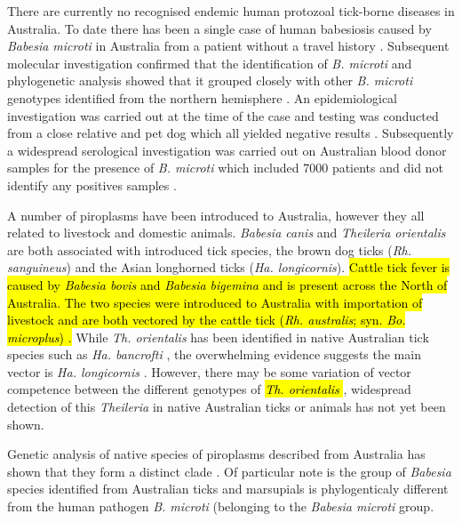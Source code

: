 \documentclass[a4paper, nobind]{templates/ociamthesis}
\begin{document}
There are currently no recognised endemic human protozoal tick-borne diseases in Australia.
To date there has been a single case of human babesiosis caused by \emph{Babesia microti} in Australia from a patient without a travel history \autocite{senanayakeFirstReportHuman2012}.
Subsequent molecular investigation confirmed that the identification of \emph{B. microti} and phylogenetic analysis showed that it grouped closely with other \emph{B. microti} genotypes identified from the northern hemisphere \autocite{papariniMolecularConfirmationFirst2014}.
An epidemiological investigation was carried out at the time of the case and testing was conducted from a close relative and pet dog which all yielded negative results \autocite{senanayakeFirstReportHuman2012}.
Subsequently a widespread serological investigation was carried out on Australian blood donor samples for the presence of \emph{B. microti} which included 7000 patients and did not identify any positives samples \autocite{faddyNoEvidenceWidespread2019}.

A number of piroplasms have been introduced to Australia, however they all related to livestock and domestic animals.
\emph{Babesia canis} and \emph{Theileria orientalis} are both associated with introduced tick species, the brown dog ticks (\emph{Rh. sanguineus}) and the Asian longhorned ticks (\emph{Ha. longicornis}).
\hl{Cattle tick fever is caused by \emph{Babesia bovis} and \emph{Babesia bigemina} and is present across the North of Australia. The two species were introduced to Australia with importation of livestock and are both vectored by the cattle tick (\emph{Rh. australis}; syn. \emph{Bo. microplus}) \autocite{angusHistoryCattleTick1996}.}
While \emph{Th. orientalis} has been identified in native Australian tick species such as \emph{Ha. bancrofti} \autocite{lakewEndemicInfectionCattle2021}, the overwhelming evidence suggests the main vector is \emph{Ha. longicornis} \autocite{marendyHaemaphysalisLongicornisLifecycle2019}.
However, there may be some variation of vector competence between the different genotypes of \hl{\emph{Th. orientalis} \autocite{forshawTheileriaOrientalisIkeda2020}}, widespread detection of this \emph{Theileria} in native Australian ticks or animals has not yet been shown.

Genetic analysis of native species of piroplasms described from Australia has shown that they form a distinct clade \autocite{barbosaSequenceAnalysesMitochondrial2019}.
Of particular note is the group of \emph{Babesia} species identified from Australian ticks and marsupials is phylogenticaly different from the human pathogen \emph{B. microti} (belonging to the \emph{Babesia microti} group.
\end{document}

